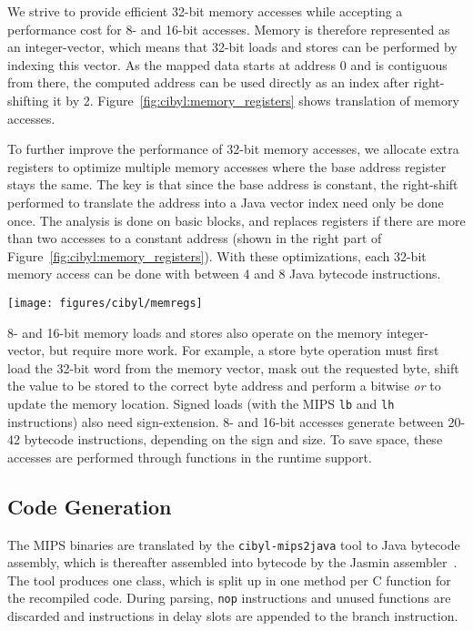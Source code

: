 We strive to provide efficient 32-bit memory accesses while accepting a
performance cost for 8- and 16-bit accesses. Memory is therefore represented
as an integer-vector, which means that 32-bit loads and stores can be
performed by indexing this vector. As the mapped data starts at address 0 and
is contiguous from there, the computed address can be used directly as an
index after right-shifting it by 2. Figure~\ref{fig:cibyl:memory_registers}
shows translation of memory accesses.

To further improve the performance of 32-bit memory accesses, we allocate
extra registers to optimize multiple memory accesses where the base address
register stays the same.  The key is that since the base address is constant,
the right-shift performed to translate the address into a Java vector index
need only be done once. The analysis is done on basic blocks, and replaces
registers if there are more than two accesses to a constant address (shown in
the right part of Figure~\ref{fig:cibyl:memory_registers}). With these
optimizations, each 32-bit memory access can be done with between 4 and 8 Java
bytecode instructions.

\begin{figure*}[thb]
  \begin{center}
    \texttt{[image: figures/cibyl/memregs]}
    \caption[Cibyl memory access]{Cibyl memory accesses. The left part shows normal memory accesses
      and the right part shows memory accesses using the special memory
      registers.}
    \label{fig:cibyl:memory_registers}
  \end{center}
\end{figure*}

8- and 16-bit memory loads and stores also operate on the memory
integer-vector, but require more work. For example, a store byte operation
must first load the 32-bit word from the memory vector, mask out the requested
byte, shift the value to be stored to the correct byte address and perform a
bitwise \emph{or} to update the memory location. Signed loads (with the MIPS
\texttt{lb} and \texttt{lh} instructions) also need sign-extension. 8- and
16-bit accesses generate between 20-42 bytecode instructions, depending on the
sign and size.  To save space, these accesses are performed through functions
in the runtime support.

\subsection{Code Generation}
The MIPS binaries are translated by the \texttt{cibyl-mips2java} tool to Java
bytecode assembly, which is thereafter assembled into bytecode by the Jasmin
assembler~\cite{jasmin}. The tool produces one class, which is split up in one
method per C function for the recompiled code. During parsing, \texttt{nop}
instructions and unused functions are discarded and instructions in delay
slots are appended to the branch instruction.

